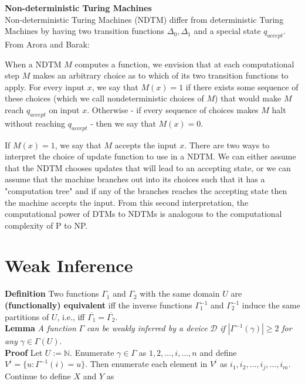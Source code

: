 \documentclass[11pt]{article}
\newcommand{\N}{\mathbb{N}}
\begin{document}
\textbf{Non-deterministic Turing Machines} \\
Non-deterministic Turing Machines (NDTM) differ from deterministic Turing Machines by having two transition functions $ \Delta_0, \Delta_1 $ and a special state $ q_{accept} $. From Arora and Barak:

\begin{displayquote}
When a NDTM $M$ computes a function, we envision that at each computational step $ M $ makes an arbitrary choice as to which of its two transition functions to apply. For every input $ x $, we say that $ M(x) = 1 $ if there exists some sequence of these choices (which we call nondeterministic choices of $ M $) that would make $ M $ reach $ q_{accept} $ on input $ x $. Otherwise - if every sequence of choices makes $ M $ halt without reaching $ q_{accept} $ - then we say that $ M(x) = 0 $. 
\end{displayquote}

If $ M(x) = 1$, we say that $ M $ accepts the input $ x $. There are two ways to interpret the choice of update function to use in a NDTM. We can either assume that the NDTM chooses updates that will lead to an accepting state, or we can assume that the machine branches out into its choices such that it has a "computation tree" and if any of the branches reaches the accepting state then the machine accepts the input. From this second interpretation, the computational power of DTMs to NDTMs is analogous to the computational complexity of P to NP. \\

\newpage
\section{Weak Inference}
\bigskip   

\textbf{Definition} \quad Two functions $ \Gamma_1 $ and $ \Gamma_2 $ with the same domain $ U $ are \textbf{(functionally) equivalent} iff the inverse functions $ \Gamma^{-1}_1 $ and $ \Gamma^{-1}_2 $ induce the same partitions of $ U $, i.e., iff $ \overline{\Gamma_1} = \overline{\Gamma_2} $. \\


\textbf{Lemma} \; \textit{A function} $ \Gamma $ \textit{can be weakly inferred by a device} $ \mathcal{D} $ \textit{if} $ |\Gamma^{-1}(\gamma)| \geq 2 $ \textit{for any} $ \gamma \in \Gamma(U) $. \\
\textbf{Proof} \; Let $ U := \N $. Enumerate $ \gamma \in \Gamma $ as $ 1, 2, \dots, i, \dots, n $ and define $ V^{i} = \{u: \Gamma^{-1}(i) = u \} $. Then enumerate each element in $ V^i $ as $ i_1, i_2, \dots, i_j, \dots, i_m $. Continue to define $ X $ and $ Y $ as 
\end{document}
